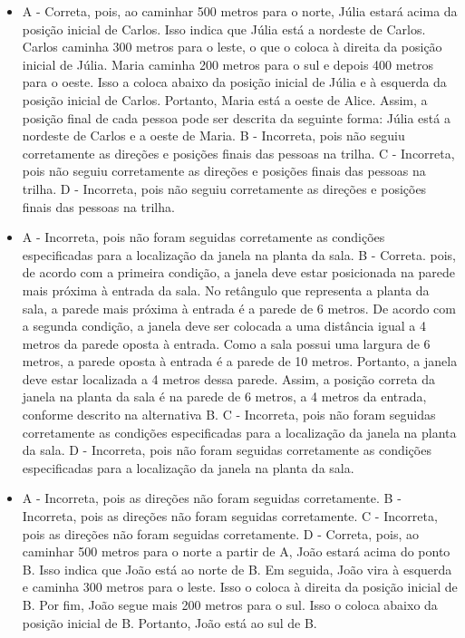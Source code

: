 \begin{itemize}
\item A - Correta, pois, ao caminhar 500 metros para o norte, Júlia estará
acima da posição inicial de Carlos. Isso indica que Júlia está a
nordeste de Carlos. Carlos caminha 300 metros para o leste, o que o
coloca à direita da posição inicial de Júlia. Maria caminha 200 metros
para o sul e depois 400 metros para o oeste. Isso a coloca abaixo da
posição inicial de Júlia e à esquerda da posição inicial de Carlos.
Portanto, Maria está a oeste de Alice. Assim, a posição final de cada
pessoa pode ser descrita da seguinte forma: Júlia está a nordeste de
Carlos e a oeste de Maria.
B - Incorreta, pois não seguiu corretamente as direções e posições
finais das pessoas na trilha.
C - Incorreta, pois não seguiu corretamente as direções e posições
finais das pessoas na trilha.
D - Incorreta, pois não seguiu corretamente as direções e posições
finais das pessoas na trilha.
\item A - Incorreta, pois não foram seguidas corretamente as condições
especificadas para a localização da janela na planta da sala.
B - Correta. pois, de acordo com a primeira condição, a janela deve
estar posicionada na parede mais próxima à entrada da sala. No retângulo
que representa a planta da sala, a parede mais próxima à entrada é a
parede de 6 metros. De acordo com a segunda condição, a janela deve ser
colocada a uma distância igual a 4 metros da parede oposta à entrada.
Como a sala possui uma largura de 6 metros, a parede oposta à entrada é
a parede de 10 metros. Portanto, a janela deve estar localizada a 4
metros dessa parede. Assim, a posição correta da janela na planta da
sala é na parede de 6 metros, a 4 metros da entrada, conforme descrito
na alternativa B.
C - Incorreta, pois não foram seguidas corretamente as condições
especificadas para a localização da janela na planta da sala.
D - Incorreta, pois não foram seguidas corretamente as condições
especificadas para a localização da janela na planta da sala.
\item A - Incorreta, pois as direções não foram seguidas corretamente.
B - Incorreta, pois as direções não foram seguidas corretamente.
C - Incorreta, pois as direções não foram seguidas corretamente.
D - Correta, pois, ao caminhar 500 metros para o norte a partir de A,
João estará acima do ponto B. Isso indica que João está ao norte de B.
Em seguida, João vira à esquerda e caminha 300 metros para o leste. Isso
o coloca à direita da posição inicial de B. Por fim, João segue mais 200
metros para o sul. Isso o coloca abaixo da posição inicial de B.
Portanto, João está ao sul de B.
\end{itemize}

